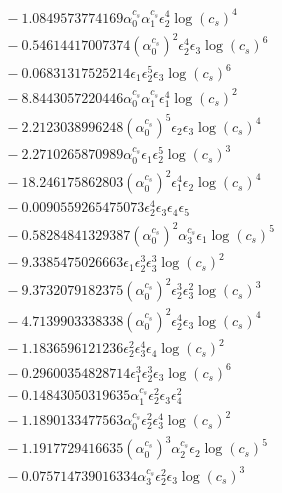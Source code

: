 \documentclass[10pt]{article}
\begin{document}
\begin{align*}
&{}  - 1.0849573774169 \alpha_{0}^{c_s} \alpha_{1}^{c_s} \epsilon_{2}^{4} \log{\left(c_{s} \right)}^{4} \\
&{}  - 0.54614417007374 \left(\alpha_{0}^{c_s}\right)^{2} \epsilon_{2}^{4} \epsilon_{3} \log{\left(c_{s} \right)}^{6} \\
&{}  - 0.06831317525214 \epsilon_{1} \epsilon_{2}^{5} \epsilon_{3} \log{\left(c_{s} \right)}^{6} \\
&{}  - 8.8443057220446 \alpha_{0}^{c_s} \alpha_{1}^{c_s} \epsilon_{1}^{4} \log{\left(c_{s} \right)}^{2} \\
&{}  - 2.2123038996248 \left(\alpha_{0}^{c_s}\right)^{5} \epsilon_{2} \epsilon_{3} \log{\left(c_{s} \right)}^{4} \\
&{}  - 2.2710265870989 \alpha_{0}^{c_s} \epsilon_{1} \epsilon_{2}^{5} \log{\left(c_{s} \right)}^{3} \\
&{}  - 18.246175862803 \left(\alpha_{0}^{c_s}\right)^{2} \epsilon_{1}^{4} \epsilon_{2} \log{\left(c_{s} \right)}^{4} \\
&{}  - 0.0090559265475073 \epsilon_{2}^{4} \epsilon_{3} \epsilon_{4} \epsilon_{5} \\
&{}  - 0.58284841329387 \left(\alpha_{0}^{c_s}\right)^{2} \alpha_{3}^{c_s} \epsilon_{1} \log{\left(c_{s} \right)}^{5} \\
&{}  - 9.3385475026663 \epsilon_{1} \epsilon_{2}^{3} \epsilon_{3}^{3} \log{\left(c_{s} \right)}^{2} \\
&{}  - 9.3732079182375 \left(\alpha_{0}^{c_s}\right)^{2} \epsilon_{2}^{3} \epsilon_{3}^{2} \log{\left(c_{s} \right)}^{3} \\
&{}  - 4.7139903338338 \left(\alpha_{0}^{c_s}\right)^{2} \epsilon_{2}^{4} \epsilon_{3} \log{\left(c_{s} \right)}^{4} \\
&{}  - 1.1836596121236 \epsilon_{2}^{2} \epsilon_{3}^{4} \epsilon_{4} \log{\left(c_{s} \right)}^{2} \\
&{}  - 0.29600354828714 \epsilon_{1}^{3} \epsilon_{2}^{3} \epsilon_{3} \log{\left(c_{s} \right)}^{6} \\
&{}  - 0.14843050319635 \alpha_{1}^{c_s} \epsilon_{2}^{2} \epsilon_{3} \epsilon_{4}^{2} \\
&{}  - 1.1890133477563 \alpha_{0}^{c_s} \epsilon_{2}^{2} \epsilon_{3}^{4} \log{\left(c_{s} \right)}^{2} \\
&{}  - 1.1917729416635 \left(\alpha_{0}^{c_s}\right)^{3} \alpha_{2}^{c_s} \epsilon_{2} \log{\left(c_{s} \right)}^{5} \\
&{}  - 0.075714739016334 \alpha_{3}^{c_s} \epsilon_{2}^{2} \epsilon_{3} \log{\left(c_{s} \right)}^{3} \\

\end{align*}
\end{document}
